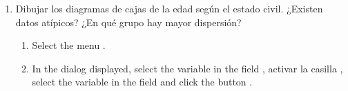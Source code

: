 \begin{enumerate}[leftmargin=*]
\begin{enumerate}
\item Dibujar los diagramas de cajas de la edad según el estado civil. ¿Existen datos atípicos? ¿En qué grupo hay mayor
dispersión?
\begin{indication}
\begin{enumerate}
\item Select the menu .
\item In the dialog displayed, select the variable  in the field ,
activar la casilla , select the variable  in the field
 and click the button .
\end{enumerate}
\end{indication}
\end{enumerate}

\end{enumerate}


